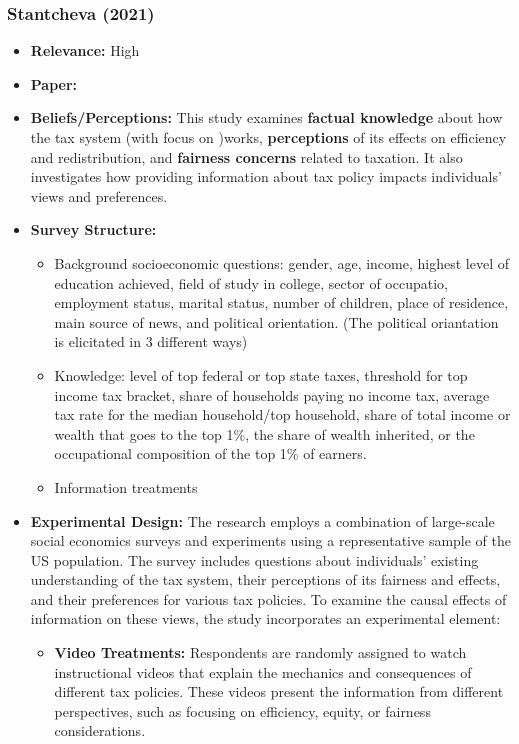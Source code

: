 \documentclass[a4paper, 12pt]{article}
\begin{document}
\subsubsection*{Stantcheva (2021)}
\begin{itemize}
        \item \textbf{Relevance:} High
        \item \textbf{Paper:} 
        \item \textbf{Beliefs/Perceptions:} This study examines \textbf{factual knowledge} about how the tax system (with focus on )works, \textbf{perceptions} of its effects on efficiency and redistribution, and \textbf{fairness concerns} related to taxation. It also investigates how providing information about tax policy impacts individuals' views and preferences.
        \item \textbf{Survey Structure:} 
        \begin{itemize}
            \item Background socioeconomic questions: gender, age, income, highest level of education achieved, field of study in college, sector of occupatio, employment status, marital status, number of children, place of residence, main source of news, and political orientation. (The political oriantation is elicitated in 3 different ways)
            \item Knowledge: level of top federal or top state taxes, threshold for top income tax bracket, share of households paying no income tax, average tax rate for the median household/top household, share of total income or wealth that goes to the top 1\%, the share of wealth inherited, or the occupational composition of the top 1\% of earners.
            \item Information treatments
        \end{itemize}
        \item \textbf{Experimental Design:} The research employs a combination of large-scale social economics surveys and experiments using a representative sample of the US population. The survey includes questions about individuals’ existing understanding of the tax system, their perceptions of its fairness and effects, and their preferences for various tax policies. To examine the causal effects of information on these views, the study incorporates an experimental element:
        \begin{itemize}
            \item \textbf{Video Treatments:} Respondents are randomly assigned to watch instructional videos that explain the mechanics and consequences of different tax policies. These videos present the information from different perspectives, such as focusing on efficiency, equity, or fairness considerations.

\end{itemize}
\end{itemize}
\end{document}
